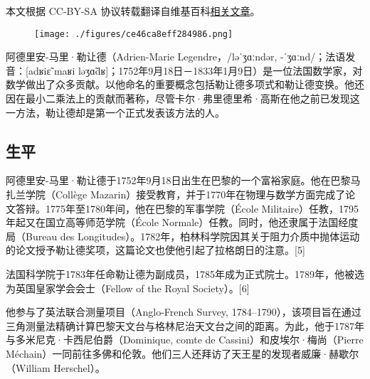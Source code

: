 
本文根据 CC-BY-SA 协议转载翻译自维基百科\href{https://en.wikipedia.org/wiki/Adrien-Marie_Legendre}{相关文章}。

\begin{figure}[ht]
\centering
\texttt{[image: ./figures/ce46ca8eff284986.png]}
\caption{} \label{fig_adla_1}
\end{figure}
阿德里安-马里·勒让德（Adrien-Marie Legendre，/ləˈʒɑːndər, -ˈʒɑːnd/；法语发音：[adʁiɛ̃ maʁi ləʒɑ̃dʁ]；1752年9月18日－1833年1月9日）是一位法国数学家，对数学做出了众多贡献。以他命名的重要概念包括勒让德多项式和勒让德变换。他还因在最小二乘法上的贡献而著称，尽管卡尔·弗里德里希·高斯在他之前已发现这一方法，勒让德却是第一个正式发表该方法的人。
\subsection{生平}
阿德里安-马里·勒让德于1752年9月18日出生在巴黎的一个富裕家庭。他在巴黎马扎兰学院（Collège Mazarin）接受教育，并于1770年在物理与数学方面完成了论文答辩。1775年至1780年间，他在巴黎的军事学院（École Militaire）任教，1795年起又在国立高等师范学院（École Normale）任教。同时，他还隶属于法国经度局（Bureau des Longitudes）。1782年，柏林科学院因其关于阻力介质中抛体运动的论文授予勒让德奖项，这篇论文也使他引起了拉格朗日的注意。[5]

法国科学院于1783年任命勒让德为副成员，1785年成为正式院士。1789年，他被选为英国皇家学会会士（Fellow of the Royal Society）。[6]

他参与了英法联合测量项目（Anglo-French Survey, 1784–1790），该项目旨在通过三角测量法精确计算巴黎天文台与格林尼治天文台之间的距离。为此，他于1787年与多米尼克·卡西尼伯爵（Dominique, comte de Cassini）和皮埃尔·梅尚（Pierre Méchain）一同前往多佛和伦敦。他们三人还拜访了天王星的发现者威廉·赫歇尔（William Herschel）。
